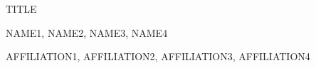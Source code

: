\documentclass[a3paper]{jsarticle}
\begin{document}
\centering
\sffamily\bfseries
\setlength\parindent{0pt}
{\color{darkblue}

\thispagestyle{empty}

\Large

TITLE

\large

NAME1,
NAME2,
NAME3,
NAME4

\normalsize

{\rmfamily\itshape\bfseries

AFFILIATION1,
AFFILIATION2,
AFFILIATION3,
AFFILIATION4

}

}
\end{document}
